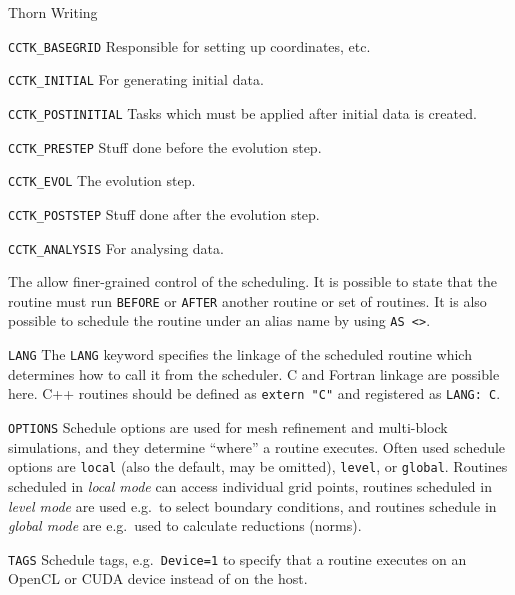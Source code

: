 \begin{cactuspart}{Thorn Writing}
\begin{Lentry}
\item [\texttt{CCTK\_BASEGRID}]
Responsible for setting up coordinates, etc.

\item [\texttt{CCTK\_INITIAL}]
For generating initial data.

\item [\texttt{CCTK\_POSTINITIAL}]
Tasks which must be applied after initial data is created.

\item [\texttt{CCTK\_PRESTEP}]
Stuff done before the evolution step.

\item [\texttt{CCTK\_EVOL}]
The evolution step.

\item [\texttt{CCTK\_POSTSTEP}]
Stuff done after the evolution step.

\item [\texttt{CCTK\_ANALYSIS}]
For analysing data.

\end{Lentry}

The  allow finer-grained control of the scheduling.  It is
possible to state that the routine must run \texttt{BEFORE} or \texttt{AFTER}
another routine or set of routines.
It is also possible to schedule the routine under an
alias name by using \texttt{AS <>}.

\begin{Lentry}

\item[\texttt{LANG}]
The \texttt{LANG} keyword specifies the linkage of the scheduled routine
which determines how to call it from the scheduler.
C and Fortran linkage are possible here. C++ routines should be defined as
\texttt{extern "C"} and registered as \texttt{LANG: C}.

\item[\texttt{OPTIONS}] Schedule options are used for mesh refinement
  and multi-block simulations, and they determine ``where'' a routine
  executes. Often used schedule options are \texttt{local} (also the
  default, may be omitted), \texttt{level}, or \texttt{global}.
  Routines scheduled in \emph{local mode} can access individual grid
  points, routines scheduled in \emph{level mode} are used e.g.\ to
  select boundary conditions, and routines schedule in \emph{global
    mode} are e.g.\ used to calculate reductions (norms).

\item[\texttt{TAGS}] Schedule tags, e.g.\ \texttt{Device=1} to specify
  that a routine executes on an OpenCL or CUDA device instead of on
  the host.


\end{Lentry}
\end{cactuspart}
